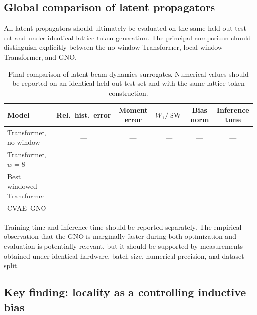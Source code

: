 \subsection{Global comparison of latent propagators}
\label{subsec:global_model_comparison}

All latent propagators should ultimately be evaluated on the same held-out test set and under identical lattice-token generation. The principal comparison should distinguish explicitly between the no-window Transformer, local-window Transformer, and GNO.

\begin{table}[H]
\centering
\caption{
Final comparison of latent beam-dynamics surrogates. Numerical values should be reported on an identical held-out test set and with the same lattice-token construction.
}
\label{tab:global_model_comparison}
\begin{tabular}{lccccc}
\toprule
Model
&
Rel.\ hist.\ error
&
Moment error
&
\(W_1/\operatorname{SW}\)
&
Bias norm
&
Inference time
\\
\midrule
Transformer, no window
&
---
&
---
&
---
&
---
&
---
\\
Transformer, \(w=8\)
&
---
&
---
&
---
&
---
&
---
\\
Best windowed Transformer
&
---
&
---
&
---
&
---
&
---
\\
CVAE--GNO
&
---
&
---
&
---
&
---
&
---
\\
\bottomrule
\end{tabular}
\end{table}

Training time and inference time should be reported separately. The empirical observation that the GNO is marginally faster during both optimization and evaluation is potentially relevant, but it should be supported by measurements obtained under identical hardware, batch size, numerical precision, and dataset split.

\subsection{Key finding: locality as a controlling inductive bias}
\label{subsec:key_finding_locality}

